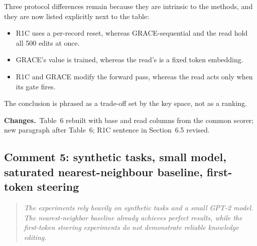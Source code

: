\documentclass[11pt]{article}
\newenvironment{reviewer}{\par\medskip\noindent\begin{quote}\itshape}{\end{quote}}
\newcommand{\changes}{\par\smallskip\noindent\textbf{Changes.}\ }
\begin{document}
Three protocol differences remain because they are intrinsic to the methods, and they are now listed explicitly next to the table:
\begin{itemize}
\item R1C uses a per-record reset, whereas GRACE-sequential and the read hold all 500 edits at once.
\item GRACE's value is trained, whereas the read's is a fixed token embedding.
\item R1C and GRACE modify the forward pass, whereas the read acts only when its gate fires.
\end{itemize}
The conclusion is phrased as a trade-off set by the key space, not as a ranking.

\changes Table~6 rebuilt with base and read columns from the common scorer; new paragraph after Table~6; R1C sentence in Section~6.5 revised.

\subsection*{Comment 5: synthetic tasks, small model, saturated nearest-neighbour baseline, first-token steering}

\begin{reviewer}
The experiments rely heavily on synthetic tasks and a small GPT-2 model. The nearest-neighbor baseline already achieves perfect results, while the first-token steering experiments do not demonstrate reliable knowledge editing.
\end{reviewer}
\end{document}
